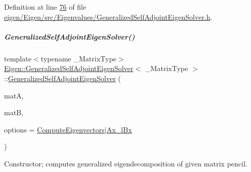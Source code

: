 Definition at line \hyperlink{eigen_2_eigen_2src_2_eigenvalues_2_generalized_self_adjoint_eigen_solver_8h_source_l00076}{76} of file \hyperlink{eigen_2_eigen_2src_2_eigenvalues_2_generalized_self_adjoint_eigen_solver_8h_source}{eigen/\+Eigen/src/\+Eigenvalues/\+Generalized\+Self\+Adjoint\+Eigen\+Solver.\+h}.

\mbox{\label{group___eigenvalues___module_addc0409c9cb1a5ac9cbbd00efe68908e}} 
\subparagraph{\texorpdfstring{Generalized\+Self\+Adjoint\+Eigen\+Solver()}{GeneralizedSelfAdjointEigenSolver()}\hspace{0.1cm}{\footnotesize\ttfamily [3/6]}}
{\footnotesize\ttfamily template$<$typename \+\_\+\+Matrix\+Type$>$ \\
\hyperlink{group___eigenvalues___module_class_eigen_1_1_generalized_self_adjoint_eigen_solver}{Eigen\+::\+Generalized\+Self\+Adjoint\+Eigen\+Solver}$<$ \+\_\+\+Matrix\+Type $>$\+::\hyperlink{group___eigenvalues___module_class_eigen_1_1_generalized_self_adjoint_eigen_solver}{Generalized\+Self\+Adjoint\+Eigen\+Solver} (\begin{DoxyParamCaption}\item[{const Matrix\+Type \&}]{matA,  }\item[{const Matrix\+Type \&}]{matB,  }\item[{int}]{options = {\ttfamily \hyperlink{group__enums_ggae3e239fb70022eb8747994cf5d68b4a9ada93d8885bde32b876ba4af01d3292cc}{Compute\+Eigenvectors}$\vert$\hyperlink{group__enums_ggae3e239fb70022eb8747994cf5d68b4a9a1a7cefbb22c2c3928d246b753cf53633}{Ax\+\_\+l\+Bx}} }\end{DoxyParamCaption})\hspace{0.3cm}{\ttfamily [inline]}}



Constructor; computes generalized eigendecomposition of given matrix pencil. 


